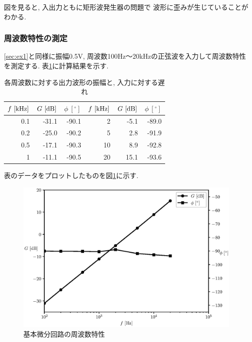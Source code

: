 \documentclass[titlepage]{jsarticle}
\begin{document}
            図を見ると,
            入出力ともに矩形波発生器の問題で
            波形に歪みが生じていることがわかる.

        \subsubsection{周波数特性の測定} \label{sec:ex2}
            \ref{sec:ex1}と同様に振幅0.5V,
            周波数100Hz〜20kHzの正弦波を入力して周波数特性を測定する.
            表\ref{tab:dif}に計算結果を示す.

            \begin{table}[h]
                \caption{各周波数に対する出力波形の振幅と, 入力に対する遅れ}
                \label{tab:dif}
                \centering
                \begin{tabular}{r|rr||r|rr}
                    $f \ [\rm{kHz}]$ & $G \ [\rm{dB}]$ & $\phi \ [^\circ]$ & $f \ [\rm{kHz}]$ & $G \ [\rm{dB}]$ & $\phi \ [^\circ]$ \\ \hline \hline
                    0.1 & -31.1 & -90.1 & 2 & -5.1 & -89.0 \\
                    0.2 & -25.0 & -90.2 & 5 & 2.8 & -91.9 \\
                    0.5 & -17.1 & -90.3 & 10 & 8.9 & -92.8 \\
                    1 & -11.1 & -90.5 & 20 & 15.1 & -93.6 \\
                \end{tabular}
            \end{table}

            表のデータをプロットしたものを図\ref{fig:difex1}に示す.

            \begin{figure}[h]
                \centering
                \includegraphics[width=0.8\hsize]{img/difex-graph1.eps}
                \caption{基本微分回路の周波数特性}
                \label{fig:difex1}
            \end{figure}
\end{document}

